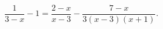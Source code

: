 \begin{ex}[type=equation]
	\begin{condition}
		$\dfrac{1}{3 - x} - 1 = \dfrac{2 - x}{x - 3} - \dfrac{7 - x}{3(x - 3)(x + 1)}.$
	\end{condition}
\end{ex}